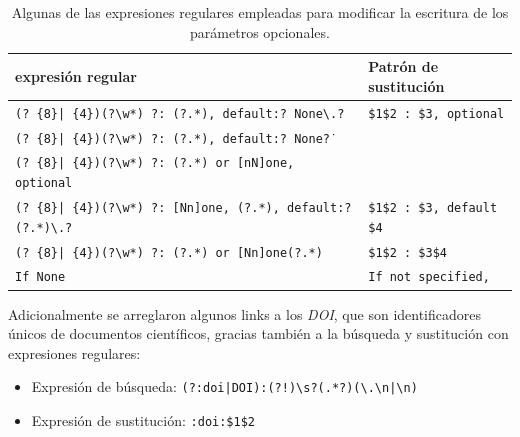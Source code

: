 \begin{table}[H]
    \centering
    \begin{adjustbox}{max width=\textwidth}
        \begin{tabular}{l|l}
            \Gls{expresión regular}                                                                                 & Patrón de sustitución              \\
            \hline
            \texttt{(? \{8\}| \{4\})(?\textbackslash{}w*) ?: (?.*), default:? None\textbackslash{}.?}               & \texttt{\$1\$2 : \$3, optional}    \\
            \texttt{(? \{8\}| \{4\})(?\textbackslash{}w*) ?: (?.*), default:? None\.?}                              &                                    \\
            \texttt{(? \{8\}| \{4\})(?\textbackslash{}w*) ?: (?.*) or {[}nN{]}one, optional}                        &                                    \\
            \hline
            \texttt{(? \{8\}| \{4\})(?\textbackslash{}w*) ?: {[}Nn{]}one, (?.*), default:? (?.*)\textbackslash{}.?} & \texttt{\$1\$2 : \$3, default \$4} \\
            \hline
            \texttt{(? \{8\}| \{4\})(?\textbackslash{}w*) ?: (?.*) or {[}Nn{]}one(?.*)}                             & \texttt{\$1\$2 : \$3\$4}           \\
            \hline
            \texttt{If None}                                                                                        & \texttt{If not specified,}         \\
        \end{tabular}
    \end{adjustbox}
    \caption{Algunas de las expresiones regulares empleadas para modificar la escritura de los parámetros opcionales.}
    \label{tab:expresiones_regulares_default_none}
\end{table}

Adicionalmente se arreglaron algunos links a los \textit{DOI}, que son identificadores únicos de documentos científicos, gracias también a la búsqueda y sustitución con expresiones regulares:

\begin{itemize}
    \item Expresión de búsqueda: \texttt{(?:doi|DOI):(?!\textasciigrave{})\textbackslash s?(.*?)(\textbackslash .\textbackslash n|\textbackslash n)}
\end{itemize}
\begin{itemize}
    \item Expresión de sustitución: \texttt{:doi:\textasciigrave{}\$1\textasciigrave{}\$2}
\end{itemize}

